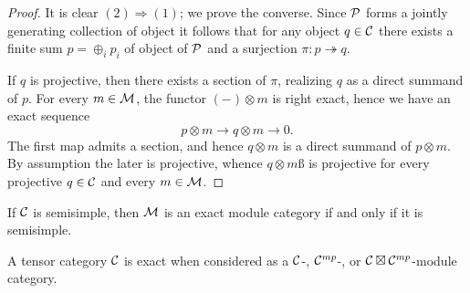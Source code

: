 \documentclass{amsart}
\begin{document}
\begin{proof}
	It is clear $(2) \Rightarrow (1)$; we prove the converse. Since $\mathcal P$ forms a jointly generating collection of object it follows that for any object $q \in \mathcal C$ there exists a finite sum $p = \oplus_i p_i$ of object of $\mathcal P$ and a surjection $\pi:p \twoheadrightarrow q$. 
	
		 If $q$ is projective, then there exists a section of $\pi$, realizing $q$ as a direct summand of $p$. For every $m \in \mathcal M$, the functor $(-)\otimes m$ is right exact, hence we have an exact sequence
		\begin{equation*}
			p \otimes m \to q \otimes m \to 0.
		\end{equation*}
		 The first map admits a section, and hence $q \otimes m$ is a direct summand of $p \otimes m$. By assumption the later is projective, whence $q \otimes mß$ is projective for every projective $q \in \mathcal C$ and every $m \in \mathcal M$. 
\end{proof}

\begin{example}
	If $\mathcal C$ is semisimple, then $\mathcal M$ is an exact module category if and only if it is semisimple.
\end{example}

\begin{example} \label{ex:exactness}
	A tensor category $\mathcal C$ is exact when considered as a $\mathcal C$-, $\mathcal C^{mp}$-, or $\mathcal C \boxtimes \mathcal C^{mp}$-module category. 
\end{example}
\end{document}
